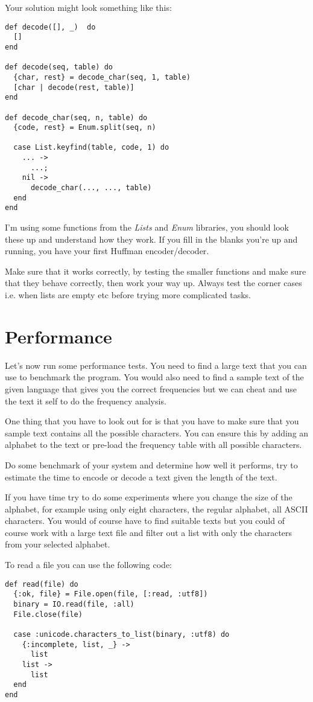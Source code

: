 \documentclass[a4paper,11pt]{article}
\begin{document}
Your solution might look something like this:

\begin{verbatim}
def decode([], _)  do
  []
end

def decode(seq, table) do
  {char, rest} = decode_char(seq, 1, table)
  [char | decode(rest, table)]
end

def decode_char(seq, n, table) do
  {code, rest} = Enum.split(seq, n)

  case List.keyfind(table, code, 1) do
    ... ->
      ...;
    nil ->
      decode_char(..., ..., table)
  end
end
\end{verbatim}

I'm using some functions from the {\em Lists} and {\em Enum}
libraries, you should look these up and understand how they work. If
you fill in the blanks you're up and running, you have your first
Huffman encoder/decoder.

Make sure that it works correctly, by testing the smaller functions
and make sure that they behave correctly, then work your way
up. Always test the corner cases i.e. when lists are empty etc before
trying more complicated tasks.



\section{Performance}

Let's now run some performance tests. You need to find a large text
that you can use to benchmark the program. You would also need to find
a sample text of the given language that gives you the correct
frequencies but we can cheat and use the text it self to do the
frequency analysis. 

One thing that you have to look out for is that you have to make sure
that you sample text contains all the possible characters. You can
ensure this by adding an alphabet to the text or pre-load the
frequency table with all possible characters.

Do some benchmark of your system and determine how well it
performs, try to estimate the time to encode or decode a text given
the length of the text. 

If you have time try to do some experiments where you change the size
of the alphabet, for example using only eight characters, the regular
alphabet, all ASCII characters. You would of course have to find
suitable texts but you could of course work with a large text file and
filter out a list with only the characters from your selected alphabet.


To read a file you can use the following code:

\begin{verbatim}
def read(file) do
  {:ok, file} = File.open(file, [:read, :utf8])
  binary = IO.read(file, :all)
  File.close(file)
  
  case :unicode.characters_to_list(binary, :utf8) do
    {:incomplete, list, _} ->
      list
    list ->
      list
  end
end
\end{verbatim}
\end{document}
